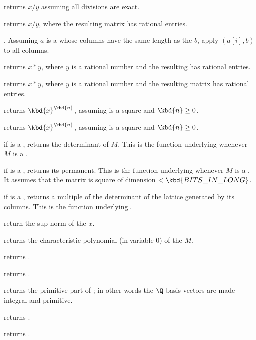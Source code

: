 returns $x/y$ assuming all divisions
are exact.

 returns $x/y$, where the resulting matrix
has rational entries.

. Assuming $a$ is a 
whose columns have the same length as the  $b$, apply
$(a[i],b)$ to all columns.

 returns $x*y$, where $y$ is a rational number
and the resulting  has rational entries.

 returns $x*y$, where $y$ is a rational number
and the resulting matrix has rational entries.

 returns $\kbd{x}^\kbd{n}$, assuming 
is a square  and $\kbd{n}\geq 0$.

 returns $\kbd{x}^\kbd{n}$, assuming 
is a square  and $\kbd{n}\geq 0$.

 if  is a , returns the determinant of
$M$. This is the function underlying  whenever $M$ is a .

 if  is a , returns its
permanent. This is the function underlying  whenever $M$
is a . It assumes that the matrix is square of dimension $<
\kbd{BITS\_IN\_LONG}$.

 if  is a , returns a multiple of
the determinant of the lattice generated by its columns. This is the function
underlying .

 return the sup norm of the  $x$.

 returns the characteristic polynomial (in
variable $0$) of the  $M$.

 returns .

 returns .

 returns the primitive part of ; in
other words the $\Q$-basis vectors are made integral and primitive.

 returns .

 returns .

